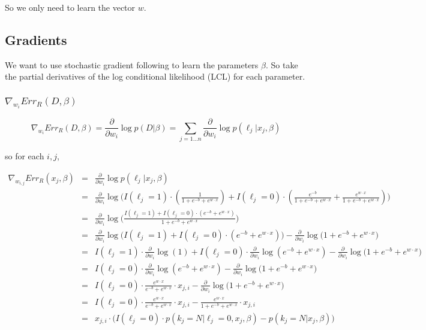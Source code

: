 \documentclass{article}
\begin{document}
So we only need to learn the vector $w$.

\subsection{Gradients}

We want to use stochastic gradient following to learn the parameters $\beta$. So take the partial derivatives of the log conditional likelihood (LCL) for each parameter.

\subsubsection{$ \nabla_{w_i}{Err_R (D, \beta)}$}

$$
\nabla_{w_i}{Err_R (D, \beta)} = \frac{\partial}{\partial w_i} \log{p(D|\beta)} =  \sum_{j=1...n}{\frac{\partial}{\partial w_i}\log{p(\ell_j | x_j, \beta)}}
$$

so for each $i,j$,


\begin{eqnarray*}
\nabla_{w_{i,j}}{Err_R (x_j, \beta)} &=& \frac{\partial}{\partial w_i}\log{p(\ell_j | x_j, \beta)} \\
 &=& \frac{\partial}{\partial w_i}
		\log{\Bigg(
			I(\ell_j=1) \cdot \left( \frac{1}{1 + e^{-b} + e^{w \cdot x}} \right) + 
			I(\ell_j=0) \cdot \left(\frac{e^{-b}}{1 + e^{-b} + e^{w \cdot x}} + \frac{e^{w \cdot x}}{1 + e^{-b} + e^{w \cdot x}} \right)
		\Bigg)} \\
 &=& \frac{\partial}{\partial w_i}
		\log{\Bigg(
		    \frac{
			I(\ell_j=1) + 
			I(\ell_j=0) \cdot \left( e^{-b} + e^{w \cdot x} \right)
		     }{1 + e^{-b} + e^{w \cdot x}}
		\Bigg)} \\
 &=& \frac{\partial}{\partial w_i}
		\log{\bigg(
			I(\ell_j=1) + 
			I(\ell_j=0) \cdot \left( e^{-b} + e^{w \cdot x} \right)
		\bigg)}
		- \frac{\partial}{\partial w_i}
		 \log{\bigg(
			1 + e^{-b} + e^{w \cdot x}
		\bigg)} \\
 &=& I(\ell_j=1) \cdot \frac{\partial}{\partial w_i}
		\log{(1)} +
    I(\ell_j=0) \cdot \frac{\partial}{\partial w_i}
		\log{ \left( e^{-b} + e^{w \cdot x} \right) }
		- \frac{\partial}{\partial w_i}
		 \log{\bigg(
			1 + e^{-b} + e^{w \cdot x}
		\bigg)} \\
 &=& I(\ell_j=0) \cdot \frac{\partial}{\partial w_i}
		\log{  \left( e^{-b} + e^{w \cdot x} \right) }
		- \frac{\partial}{\partial w_i}
		 \log{\bigg(
			1 + e^{-b} + e^{w \cdot x}
		\bigg)} \\
 &=& I(\ell_j=0) \cdot 
 		\frac{
			e^{w \cdot x}
		}{
			e^{-b} + e^{w \cdot x}
		} \cdot x_{j,i}
		- \frac{\partial}{\partial w_i}
		 \log{\Big(
			1 + e^{-b} + e^{w \cdot x}
		\Big)} \\
 &=& I(\ell_j=0) \cdot 
 		\frac{
			e^{w \cdot x}
		}{
			e^{-b} + e^{w \cdot x}
		} \cdot x_{j,i}
		- \frac{e^{w \cdot x}}{
			1 + e^{-b} + e^{w \cdot x}
		} \cdot x_{j,i} \\
 &=& x_{j,i} \cdot
    \big(	I(\ell_j=0) \cdot p(k_j=N | \ell_j=0, x_j, \beta) - 
		p(k_j=N | x_j, \beta)
    \big) \\
\end{eqnarray*}
\end{document}
